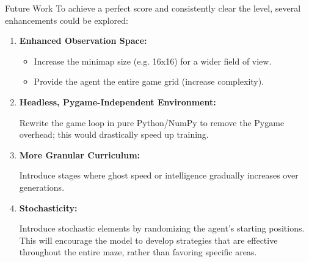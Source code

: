 \begin{frame}{Future Work}
	To achieve a perfect score and consistently clear the level, several enhancements could be explored:
	
	\begin{enumerate}
		\setlength\itemindent{-0.5em}
		\item \textbf{Enhanced Observation Space:}
		\begin{itemize}
			\setlength\itemindent{-1.5em}
			\item Increase the minimap size (e.g. 16x16) for a wider field of view.
			\item Provide the agent the entire game grid (increase complexity).
		\end{itemize}

		\vspace{0.5em}

		\item \textbf{Headless, Pygame-Independent Environment:}
		
		Rewrite the game loop in pure Python/NumPy to remove the Pygame overhead; this would drastically speed up training.
		
		\vspace{0.5em}

		\item \textbf{More Granular Curriculum:}
		
		Introduce stages where ghost speed or intelligence gradually increases over generations.

		\vspace{0.5em}

		\item \textbf{Stochasticity:}
		
		Introduce stochastic elements by randomizing the agent's starting positions. This will encourage the model to develop strategies that are effective throughout the entire maze, rather than favoring specific areas.

	\end{enumerate}
\end{frame}